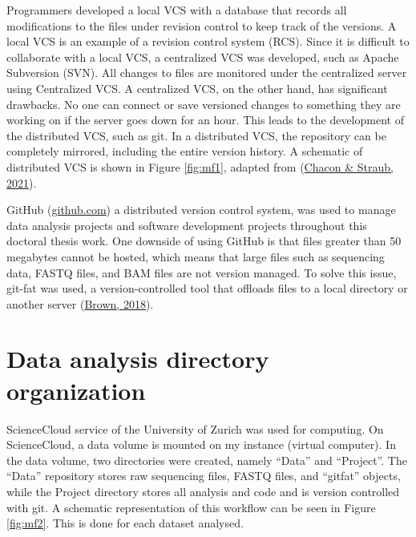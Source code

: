 \documentclass[12pt,twoside]{reedthesis}
\begin{document}
Programmers developed a local VCS with a database that records all
modifications to the files under revision control to keep track of the
versions. A local VCS is an example of a revision control system (RCS).
Since it is difficult to collaborate with a local VCS, a centralized VCS
was developed, such as Apache Subversion (SVN). All changes to files are
monitored under the centralized server using Centralized VCS. A
centralized VCS, on the other hand, has significant drawbacks. No one
can connect or save versioned changes to something they are working on
if the server goes down for an hour. This leads to the development of
the distributed VCS, such as git. In a distributed VCS, the repository
can be completely mirrored, including the entire version history. A
schematic of distributed VCS is shown in Figure \ref{fig:mf1}, adapted
from (\protect\hyperlink{ref-chacon2021}{Chacon \& Straub, 2021}).

GitHub (\href{https://github.com}{github.com}) a distributed version control
system, was used to manage data analysis projects and software
development projects throughout this doctoral thesis work. One downside
of using GitHub is that files greater than 50 megabytes cannot be
hosted, which means that large files such as sequencing data, FASTQ
files, and BAM files are not version managed. To solve this issue,
git-fat was used, a version-controlled tool that offloads files to a
local directory or another server (\protect\hyperlink{ref-brown2018}{Brown, 2018}).

\hypertarget{m2}{%
\section*{Data analysis directory organization}\label{m2}}

ScienceCloud service of the University of Zurich was used for computing.
On ScienceCloud, a data volume is mounted on my instance (virtual
computer). In the data volume, two directories were created, namely
``Data'' and ``Project''. The ``Data'' repository stores raw sequencing files,
FASTQ files, and ``gitfat'' objects, while the Project directory stores
all analysis and code and is version controlled with git. A schematic
representation of this workflow can be seen in Figure \ref{fig:mf2}.
This is done for each dataset analysed.
\end{document}
